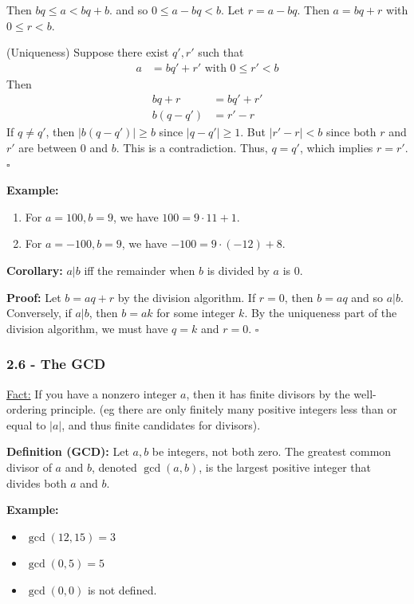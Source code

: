\documentclass{article}
\newcommand*{\qed}{\hfill$\square$}%
\newcommand*{\txt}[1]{\text{ #1 }}%
\begin{document}
Then $bq\leq a<bq+b$. and so $0\leq a-bq<b$. Let $r=a-bq$. Then $a=bq+r$ with $0\leq r < b$. 

(Uniqueness) Suppose there exist $q',r'$ such that \begin{align*}
    a &= bq' + r' \txt{ with } 0 \leq r' < b
\end{align*}
Then \begin{align*}
    bq + r &= bq' + r' \\
    b(q-q') &= r' - r
\end{align*}
If $q \neq q'$, then $|b(q-q')| \geq b$ since $|q-q'| \geq 1$. But $|r'-r| < b$ since both $r$ and $r'$ are between $0$ and $b$. This is a contradiction. Thus, $q=q'$, which implies $r=r'$. \qed

\textbf{Example:} \begin{enumerate}
    \item For $a=100, b=9$, we have $100=9\cdot 11 + 1$.
    \item For $a=-100, b=9$, we have $-100=9\cdot (-12) + 8$.
\end{enumerate}

\textbf{Corollary:} $a|b$ iff the remainder when $b$ is divided by $a$ is 0.

\textbf{Proof:} Let $b=aq+r$ by the division algorithm. If $r=0$, then $b=aq$ and so $a|b$. Conversely, if $a|b$, then $b=ak$ for some integer $k$. By the uniqueness part of the division algorithm, we must have $q=k$ and $r=0$. \qed

\subsubsection{2.6 - The GCD}

\underline{Fact:} If you have a nonzero integer $a$, then it has finite divisors by the well-ordering principle. (eg there are only finitely many positive integers less than or equal to $|a|$, and thus finite candidates for divisors). 

\textbf{Definition (GCD):} Let $a,b$ be integers, not both zero. The greatest common divisor of $a$ and $b$, denoted $\gcd(a,b)$, is the largest positive integer that divides both $a$ and $b$.

\textbf{Example:} \begin{itemize}
    \item $\gcd(12,15)=3$
    \item $\gcd(0,5)=5$
    \item $\gcd(0,0)$ is not defined.
\end{itemize}
\end{document}
